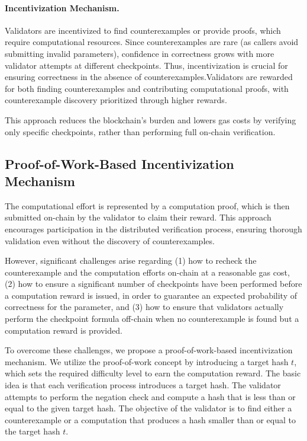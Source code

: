 \documentclass[runningheads]{llncs}
\begin{document}
\paragraph{\textbf{Incentivization Mechanism.}} Validators are incentivized to find counterexamples or provide proofs, which require computational resources. Since counterexamples are rare (as callers avoid submitting invalid parameters), confidence in correctness grows with more validator attempts at different checkpoints. Thus, incentivization is crucial for ensuring correctness in the absence of counterexamples.Validators are rewarded for both finding counterexamples and contributing computational proofs, with  counterexample discovery prioritized through higher rewards. 

This approach reduces the blockchain's burden and lowers gas costs by verifying only specific checkpoints, rather than performing full on-chain verification.
\subsection{Proof-of-Work-Based Incentivization Mechanism}
The computational effort is represented by a computation proof, which is then submitted on-chain by the validator to claim their reward. This approach encourages participation in the distributed verification process, ensuring thorough validation even without the discovery of counterexamples.

However, significant challenges arise regarding (1) how to recheck the counterexample and the computation efforts on-chain at a reasonable gas cost, (2) how to ensure a significant number of checkpoints have been performed before a computation reward is issued, in order to guarantee an expected probability of correctness for the parameter, and (3) how to ensure that validators actually perform the checkpoint formula off-chain when no counterexample is found but a computation reward is provided.

To overcome these challenges, we propose a proof-of-work-based incentivization mechanism. We utilize the proof-of-work concept \cite{dwork1992pow,nakamoto2008bitcoin} by introducing a target hash \( t \), which sets the required difficulty level to earn the computation reward. The basic idea is that each verification process introduces a target hash. The validator attempts to perform the negation check and compute a hash that is less than or equal to the given target hash. The objective of the validator is to find either a counterexample or a computation that produces a hash smaller than or equal to the target hash \( t \).
\end{document}
